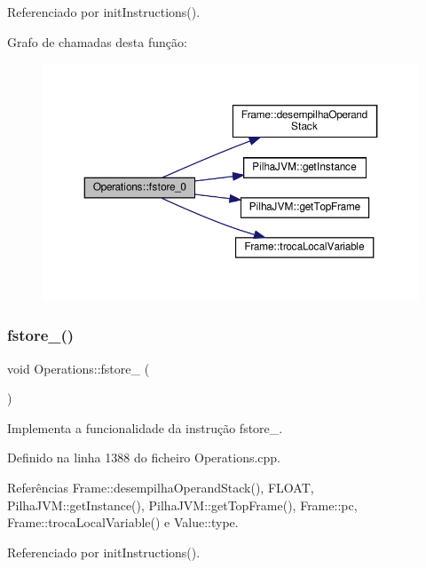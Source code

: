 Referenciado por init\+Instructions().

Grafo de chamadas desta função\+:\nopagebreak
\begin{figure}[H]
\begin{center}
\leavevmode
\includegraphics[width=350pt]{classOperations_a7465534bbf4e4ca9f0493a8dbe645d46_cgraph}
\end{center}
\end{figure}
\mbox{\label{classOperations_a2ea876acd29db9eec798302229bfd5e5}} 
\subsubsection{\texorpdfstring{fstore\+\_()}{fstore\_1()}}
{\footnotesize\ttfamily void Operations\+::fstore\+\_ (\begin{DoxyParamCaption}{ }\end{DoxyParamCaption})\hspace{0.3cm}{\ttfamily [private]}}



Implementa a funcionalidade da instrução fstore\+\_. 



Definido na linha 1388 do ficheiro Operations.\+cpp.



Referências Frame\+::desempilha\+Operand\+Stack(), F\+L\+O\+AT, Pilha\+J\+V\+M\+::get\+Instance(), Pilha\+J\+V\+M\+::get\+Top\+Frame(), Frame\+::pc, Frame\+::troca\+Local\+Variable() e Value\+::type.



Referenciado por init\+Instructions().

